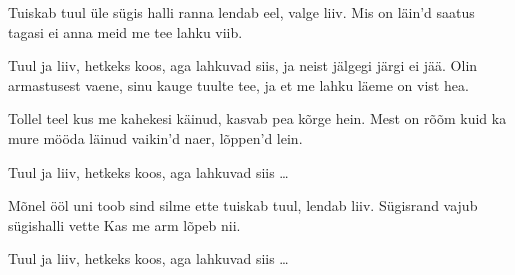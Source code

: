 Tuiskab tuul \"ule s\"ugis halli ranna
lendab eel, valge liiv.
Mis on l\"ain'd saatus tagasi ei anna
meid me tee lahku viib.

Tuul ja liiv, hetkeks koos, aga lahkuvad siis,
ja neist j\"algegi j\"argi ei j\"a\"a.
Olin armastusest vaene, sinu kauge tuulte tee,
ja et me lahku l\"aeme on vist hea.

Tollel teel kus me kahekesi k\"ainud,
kasvab pea k\~orge hein.
Mest on r\~o\~om kuid ka mure m\"o\"oda l\"ainud
vaikin'd naer, l\~oppen'd lein.

Tuul ja liiv, hetkeks koos, aga lahkuvad siis \ldots

M\~onel \"o\"ol uni toob sind silme ette
tuiskab tuul, lendab liiv.
S\"ugisrand vajub s\"ugishalli vette
Kas me arm l\~opeb nii.

Tuul ja liiv, hetkeks koos, aga lahkuvad siis \ldots

